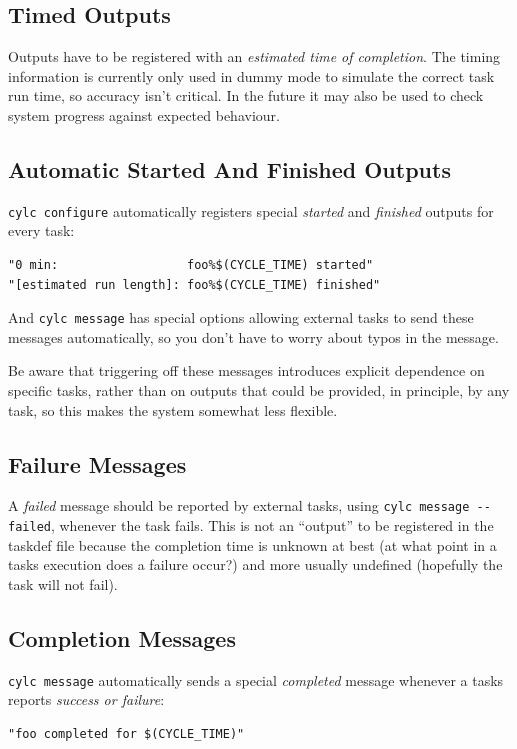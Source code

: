 \documentclass[11pt,a4paper]{article}
\begin{document}
\subsection{Timed Outputs}

Outputs have to be registered with an {\em estimated time of completion}.
The timing information is currently only used in dummy mode to simulate
the correct task run time, so accuracy isn't critical. In the future
it may also be used to check system progress against expected behaviour.

\subsection{Automatic Started And Finished Outputs}

\lstinline=cylc configure= automatically registers special {\em started}
and {\em finished} outputs for every task: 

\begin{lstlisting}
"0 min:                  foo%$(CYCLE_TIME) started"
"[estimated run length]: foo%$(CYCLE_TIME) finished"
\end{lstlisting}

And \lstinline=cylc message= has special options allowing external
tasks to send these messages automatically, so you don't have to worry
about typos in the message.

Be aware that triggering off these messages introduces explicit
dependence on specific tasks, rather than on outputs that could be
provided, in principle, by any task, so this makes the system somewhat
less flexible.


\subsection{Failure Messages}

A {\em failed} message should be reported by external tasks, using 
\lstinline=cylc message --failed=, whenever the task fails. This is 
not an ``output'' to be registered in the taskdef file because the
completion time is unknown at best (at what point in a tasks execution
does a failure occur?) and more usually undefined (hopefully the task
will not fail). 

\subsection{Completion Messages}

\lstinline=cylc message= automatically sends a special {\em completed}
message whenever a tasks reports {\em success or failure}:
\begin{lstlisting}
"foo completed for $(CYCLE_TIME)"
\end{lstlisting}
 
\end{document}
